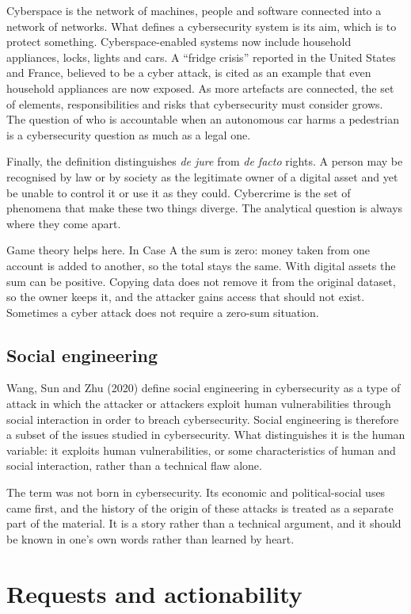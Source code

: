 Cyberspace is the network of machines, people and software connected into a network of networks. What defines a cybersecurity system is its aim, which is to protect something. Cyberspace-enabled systems now include household appliances, locks, lights and cars. A ``fridge crisis'' reported in the United States and France, believed to be a cyber attack, is cited as an example that even household appliances are now exposed. As more artefacts are connected, the set of elements, responsibilities and risks that cybersecurity must consider grows. The question of who is accountable when an autonomous car harms a pedestrian is a cybersecurity question as much as a legal one.

Finally, the definition distinguishes \emph{de jure} from \emph{de facto} rights. A person may be recognised by law or by society as the legitimate owner of a digital asset and yet be unable to control it or use it as they could. Cybercrime is the set of phenomena that make these two things diverge. The analytical question is always where they come apart.

Game theory helps here. In Case A the sum is zero: money taken from one account is added to another, so the total stays the same. With digital assets the sum can be positive. Copying data does not remove it from the original dataset, so the owner keeps it, and the attacker gains access that should not exist. Sometimes a cyber attack does not require a zero-sum situation.

\subsection{Social engineering}
Wang, Sun and Zhu (2020) define social engineering in cybersecurity as a type of attack in which the attacker or attackers exploit human vulnerabilities through social interaction in order to breach cybersecurity. Social engineering is therefore a subset of the issues studied in cybersecurity. What distinguishes it is the human variable: it exploits human vulnerabilities, or some characteristics of human and social interaction, rather than a technical flaw alone.

The term was not born in cybersecurity. Its economic and political-social uses came first, and the history of the origin of these attacks is treated as a separate part of the material. It is a story rather than a technical argument, and it should be known in one's own words rather than learned by heart.

\section{Requests and actionability}

